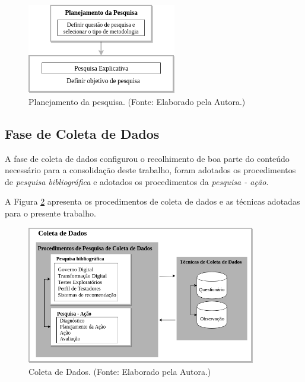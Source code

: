         \begin{figure}[H]
          \centering
          \includegraphics[width=6.5cm]{figuras/planejamentoPesquisa.png}
          \caption{Planejamento da pesquisa. (Fonte: Elaborado pela Autora.)}
          \label{fig:PlanPesquisa}

        \end{figure}




\subsection{Fase de Coleta de Dados}

A fase de coleta de dados configurou o recolhimento de boa parte do conteúdo necessário para a consolidação deste trabalho, foram adotados os procedimentos de \textit{pesquisa bibliográfica} e adotados os procedimentos da \textit{pesquisa - ação}.

A Figura \ref{fig:coletaDados} apresenta os procedimentos de coleta de dados e as técnicas adotadas para o presente trabalho.

        \begin{figure}[H]
          \centering
          \includegraphics[width=10cm]{figuras/coletadeDados.png}
          \caption{Coleta de Dados. (Fonte: Elaborado pela Autora.)}
          \label{fig:coletaDados}

        \end{figure}

